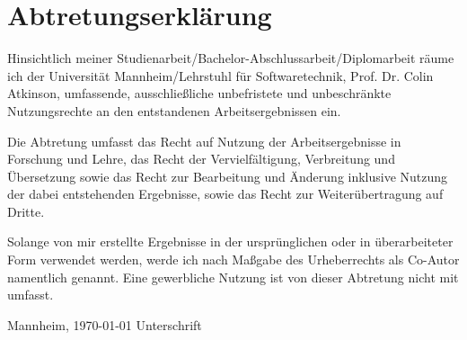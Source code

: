 \chapter*{Abtretungserkl\"arung}
\thispagestyle{empty}
Hinsichtlich meiner Studienarbeit/Bachelor-Abschlussarbeit/Diplomarbeit r\"aume ich der Universit\"at Mannheim/Lehrstuhl f{\"u}r Softwaretechnik,
Prof. Dr. Colin Atkinson, umfassende, ausschlie{\ss}liche unbefristete und
unbeschr\"ankte Nutzungsrechte an den entstandenen Arbeitsergebnissen ein.

Die Abtretung umfasst das Recht auf Nutzung der Arbeitsergebnisse in Forschung
und Lehre, das Recht der Vervielf\"altigung, Verbreitung und \"Ubersetzung sowie
das Recht zur Bearbeitung und \"Anderung inklusive Nutzung der dabei
entstehenden Ergebnisse, sowie das Recht zur Weiter\"ubertragung auf Dritte.

Solange von mir erstellte Ergebnisse in der urspr\"unglichen oder in
\"uberarbeiteter Form verwendet werden, werde ich nach Ma{\ss}gabe des Urheberrechts
als Co-Autor namentlich genannt. Eine gewerbliche Nutzung ist von dieser
Abtretung nicht mit umfasst.
\bigskip

\vspace{2.5cm}

Mannheim, \today \hspace{7cm} Unterschrift\\
